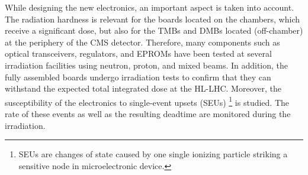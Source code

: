 While designing the new electronics, an important aspect is taken into account. The radiation
hardness is relevant for the boards located on the chambers, which receive a significant dose, but
also for the TMBs and DMBs located (off-chamber) at the periphery of the CMS detector. Therefore, many
components such as optical transceivers, regulators, and EPROMs have been tested at several
irradiation facilities using neutron, proton, and mixed beams. In addition, the fully assembled boards
undergo irradiation tests to confirm that they can withstand the expected total integrated dose at the
HL-LHC. Moreover, the susceptibility of the electronics to single-event upsets (SEUs) \footnote{SEUs are changes of state caused by one single ionizing particle striking a sensitive node in microelectronic device.} is studied.
The rate of these events as well as the resulting deadtime are monitored during the irradiation. 
